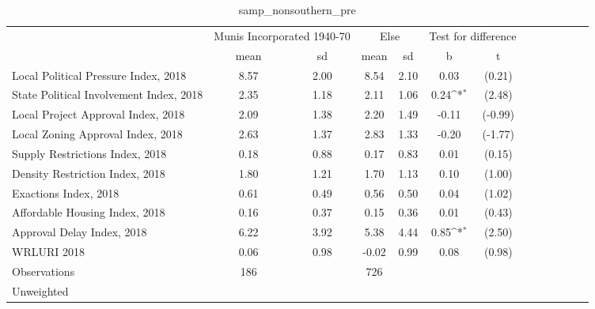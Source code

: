 \begin{table}[htbp]\centering
\def\sym#1{\ifmmode^{#1}\else\(^{#1}\)\fi}
\caption{samp\_nonsouthern\_pre \label{tab1}}
\begin{tabular}{l*{3}{cccc}}
\toprule
                    &\multicolumn{2}{c}{Munis Incorporated 1940-70}&\multicolumn{2}{c}{Else} &\multicolumn{2}{c}{Test for difference}\\
                    &        mean&          sd&        mean&          sd&           b         &           t\\
\midrule
Local Political Pressure Index, 2018&        8.57&        2.00&        8.54&        2.10&        0.03         &      (0.21)\\
State Political Involvement Index, 2018&        2.35&        1.18&        2.11&        1.06&        0.24\sym{*}  &      (2.48)\\
Local Project Approval Index, 2018&        2.09&        1.38&        2.20&        1.49&       -0.11         &     (-0.99)\\
Local Zoning Approval Index, 2018&        2.63&        1.37&        2.83&        1.33&       -0.20         &     (-1.77)\\
Supply Restrictions Index, 2018&        0.18&        0.88&        0.17&        0.83&        0.01         &      (0.15)\\
Density Restriction Index, 2018&        1.80&        1.21&        1.70&        1.13&        0.10         &      (1.00)\\
Exactions Index, 2018&        0.61&        0.49&        0.56&        0.50&        0.04         &      (1.02)\\
Affordable Housing Index, 2018&        0.16&        0.37&        0.15&        0.36&        0.01         &      (0.43)\\
Approval Delay Index, 2018&        6.22&        3.92&        5.38&        4.44&        0.85\sym{*}  &      (2.50)\\
WRLURI 2018         &        0.06&        0.98&       -0.02&        0.99&        0.08         &      (0.98)\\
\midrule
Observations        &         186&            &         726&            &                     &            \\
\bottomrule
\multicolumn{7}{l}{\footnotesize Unweighted}\\
\end{tabular}
\end{table}
